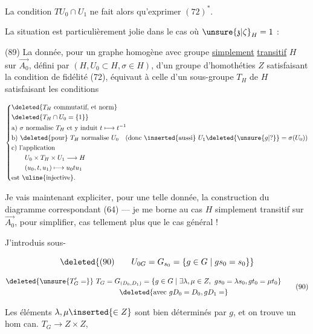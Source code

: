 

La condition $TU_0\cap U_1$ ne fait alors qu'exprimer $(72)^*$.

La situation est particulièrement jolie dans le cas où $\unsure{\mathfrak z|\zeta}_H=1$ :

(89) La donnée, pour un graphe homogène avec groupe \uline{simplement} \uline{transitif} $H$ sur $\overrightarrow{A_0}$, défini par $(H,U_0\subset H,\sigma\in H)$, d'un groupe d'homothéties $Z$ satisfaisant la condition de fidélité (72), équivaut à celle d'un sous-groupe $T_H$ de $H$ satisfaisant les conditions

\[
\left\{\begin{aligned}
&\deleted{T_H\text{ commutatif, et norm}}\\
&\deleted{T_H\cap U_0=\{1\}}\\
&\text{a) }\sigma\text{ normalise }T_H\text{ et y induit }t\longmapsto t^{-1}\\
&\text{b) }\deleted{\text{pour}}\ T_H\text{ normalise }U_0\quad(\text{donc \inserted{aussi} }U_1\deleted{\unsure{g|?}}= \sigma(U_0))\\
&\text{c) l'application}\\
&\qquad U_0\times T_H\times U_1\longrightarrow H\\
&\qquad(u_0,t,u_1)\longmapsto u_0tu_1\\
&\text{est \uline{injective}.}
\end{aligned}\right.
\]


Je vais maintenant expliciter, pour une telle donnée, la construction du diagramme correspondant (64) --- je me borne au cas $H$ simplement transitif sur $\overrightarrow{A_0}$, pour simplifier, cas tellement plus  que le cas général !

J'introduis  sous-

\[
\deleted{(90)\qquad U_{0G}=G_{s_0}=\{g\in G\mid gs_0=s_0\}}
\]

\[
\begin{aligned}
\deleted{\unsure{T'_G=}}\ T_G&=G_{(D_0,D_1)}=\{g\in G\mid\exists\lambda,\mu\in Z,\ gs_0=\lambda s_0,gt_0=\mu t_0\}\\
&\qquad\deleted{\text{avec }gD_0=D_0,gD_1=}
\end{aligned}
\tag*{(90)}
\]

Les éléments $\lambda,\mu\inserted{\in Z}$ sont bien déterminés par $g$, et on trouve un hom can. $T_G\longrightarrow Z\times Z$, 

